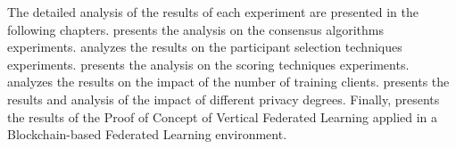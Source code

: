 The detailed analysis of the results of each experiment are presented in the following chapters.  presents the analysis on the consensus algorithms experiments.  analyzes the results on the participant selection techniques experiments.  presents the analysis on the scoring techniques experiments.  analyzes the results on the impact of the number of training clients.  presents the results and analysis of the impact of different privacy degrees. Finally,  presents the results of the Proof of Concept of Vertical Federated Learning applied in a Blockchain-based Federated Learning environment.

